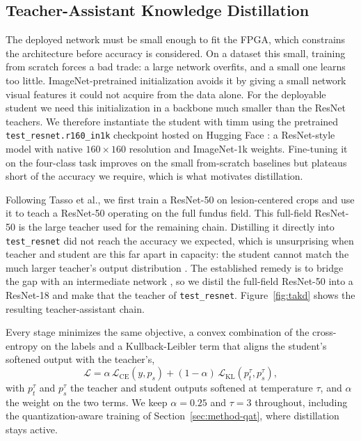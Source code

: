 \subsection{Teacher-Assistant Knowledge Distillation}
\label{sec:method-kd}

The deployed network must be small enough to fit the FPGA, which constrains the
architecture before accuracy is considered. On a dataset this small, training from
scratch forces a bad trade: a large network overfits, and a small one learns too
little. ImageNet-pretrained initialization avoids it by giving a small network
visual features it could not acquire from the data alone. For the deployable
student we need this initialization in a backbone much smaller than the ResNet
teachers. We therefore instantiate the student with timm using the pretrained
\texttt{test\_resnet.r160\_in1k} checkpoint hosted on Hugging Face
\cite{hfTestResnet}: a ResNet-style model with native $160\times160$ resolution
and ImageNet-1k weights. Fine-tuning it on the four-class task
improves on the small from-scratch baselines but plateaus short of the accuracy
we require, which is what motivates distillation.

Following Tasso et al., we first train a ResNet-50 \cite{he2016resnet} on
lesion-centered crops and use it to teach a ResNet-50 operating on the full
fundus field. This full-field ResNet-50 is the large teacher used for the
remaining chain. Distilling it directly into \texttt{test\_resnet} did not reach
the accuracy we expected, which is unsurprising when teacher and student are this
far apart in capacity: the student cannot match the much larger teacher's output
distribution \cite{cho2019efficacy}. The established remedy is to bridge the gap
with an intermediate network \cite{mirzadeh2020takd}, so we distil the full-field
ResNet-50 into a ResNet-18 and make that the teacher of \texttt{test\_resnet}.
Figure~\ref{fig:takd} shows the resulting teacher-assistant chain.

Every stage minimizes the same objective, a convex combination of the
cross-entropy on the labels and a Kullback-Leibler term that aligns the student's
softened output with the teacher's,
\begin{equation}
\mathcal{L} = \alpha\,\mathcal{L}_{\mathrm{CE}}(y, p_s)
            + (1-\alpha)\,\mathcal{L}_{\mathrm{KL}}(p_t^{\tau}, p_s^{\tau}),
\end{equation}
with $p_t^{\tau}$ and $p_s^{\tau}$ the teacher and student outputs softened at
temperature $\tau$, and $\alpha$ the weight on the two terms. We keep
$\alpha = 0.25$ and $\tau = 3$ throughout, including the quantization-aware
training of Section~\ref{sec:method-qat}, where distillation stays active.

